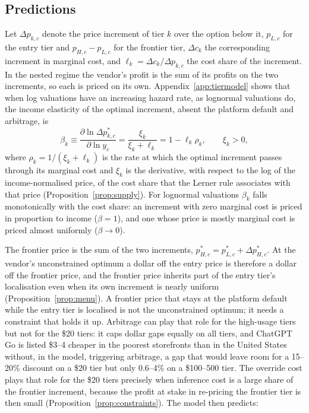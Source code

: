 \documentclass[11pt]{article}
\theoremstyle{definition}
\theoremstyle{remark}
\begin{document}
\subsection{Predictions}\label{sec:predictions}

Let $\Delta p_{k,c}$ denote the price increment of tier $k$ over the option below it, $p_{L,c}$ for the entry tier and $p_{H,c}-p_{L,c}$ for the frontier tier, $\Delta c_k$ the corresponding increment in marginal cost, and $\ell_k=\Delta c_k/\Delta p_{k,c}$ the cost share of the increment. In the nested regime the vendor's profit is the sum of its profits on the two increments, so each is priced on its own. Appendix~\ref{app:tiermodel} shows that when log valuations have an increasing hazard rate, as lognormal valuations do, the income elasticity of the optimal increment, absent the platform default and arbitrage, is
\begin{equation}
\beta_k\equiv\frac{\partial\ln\Delta p^*_{k,c}}{\partial\ln y_c}=\frac{\xi_k}{\xi_k+\ell_k}=1-\ell_k\rho_k,\qquad \xi_k>0,
\label{eq:beta_supply}
\end{equation}
where $\rho_k=1/(\xi_k+\ell_k)$ is the rate at which the optimal increment passes through its marginal cost and $\xi_k$ is the derivative, with respect to the log of the income-normalised price, of the cost share that the Lerner rule associates with that price (Proposition~\ref{prop:supply}). For lognormal valuations $\beta_k$ falls monotonically with the cost share: an increment with zero marginal cost is priced in proportion to income ($\beta=1$), and one whose price is mostly marginal cost is priced almost uniformly ($\beta\to0$).

The frontier price is the sum of the two increments, $p^*_{H,c}=p^*_{L,c}+\Delta p^*_{H,c}$. At the vendor's unconstrained optimum a dollar off the entry price is therefore a dollar off the frontier price, and the frontier price inherits part of the entry tier's localisation even when its own increment is nearly uniform (Proposition~\ref{prop:menu}). A frontier price that stays at the platform default while the entry tier is localised is not the unconstrained optimum; it needs a constraint that holds it up. Arbitrage can play that role for the high-usage tiers but not for the \$20 tiers: it caps dollar gaps equally on all tiers, and ChatGPT Go is listed \$3--4 cheaper in the poorest storefronts than in the United States without, in the model, triggering arbitrage, a gap that would leave room for a 15--20\% discount on a \$20 tier but only 0.6--4\% on a \$100--500 tier. The override cost plays that role for the \$20 tiers precisely when inference cost is a large share of the frontier increment, because the profit at stake in re-pricing the frontier tier is then small (Proposition~\ref{prop:constraints}). The model then predicts:
\end{document}
